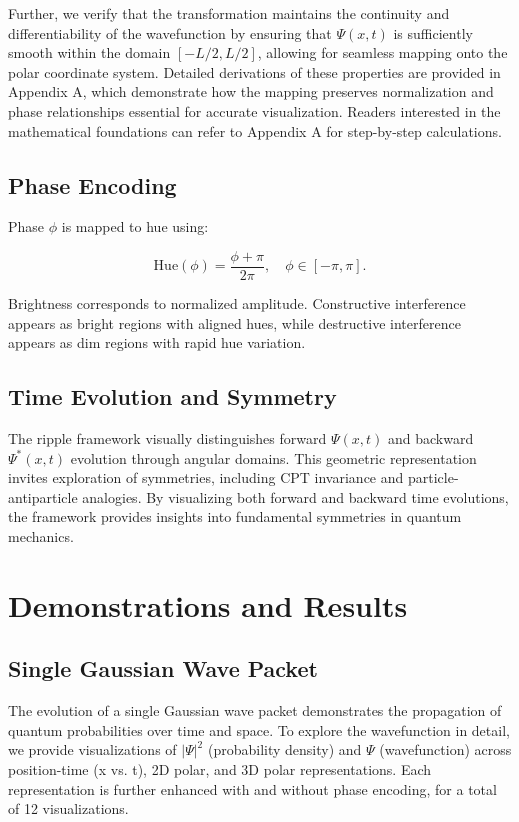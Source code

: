 \documentclass[12pt]{article}
\begin{document}
Further, we verify that the transformation maintains the continuity and differentiability of the wavefunction by ensuring that \(\Psi(x,t)\) is sufficiently smooth within the domain \([-L/2, L/2]\), allowing for seamless mapping onto the polar coordinate system. Detailed derivations of these properties are provided in Appendix A, which demonstrate how the mapping preserves normalization and phase relationships essential for accurate visualization. Readers interested in the mathematical foundations can refer to Appendix A for step-by-step calculations.

\subsection{Phase Encoding}
Phase \(\phi\) is mapped to hue using:

\[
\text{Hue}(\phi) = \frac{\phi + \pi}{2\pi}, \quad \phi \in [-\pi, \pi].
\]

Brightness corresponds to normalized amplitude. Constructive interference appears as bright regions with aligned hues, while destructive interference appears as dim regions with rapid hue variation.

\subsection{Time Evolution and Symmetry}
The ripple framework visually distinguishes forward \(\Psi(x,t)\) and backward \(\Psi^*(x,t)\) evolution through angular domains. This geometric representation invites exploration of symmetries, including CPT invariance and particle-antiparticle analogies. By visualizing both forward and backward time evolutions, the framework provides insights into fundamental symmetries in quantum mechanics.

\section{Demonstrations and Results}
\subsection{Single Gaussian Wave Packet}
The evolution of a single Gaussian wave packet demonstrates the propagation of quantum probabilities over time and space. To explore the wavefunction in detail, we provide visualizations of \(|\Psi|^2\) (probability density) and \(\Psi\) (wavefunction) across position-time (x vs. t), 2D polar, and 3D polar representations. Each representation is further enhanced with and without phase encoding, for a total of 12 visualizations.
\end{document}
